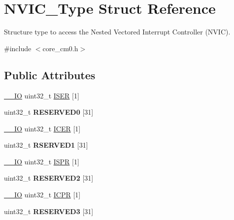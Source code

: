 \hypertarget{struct_n_v_i_c___type}{}\section{N\+V\+I\+C\+\_\+\+Type Struct Reference}
\label{struct_n_v_i_c___type}


Structure type to access the Nested Vectored Interrupt Controller (N\+V\+IC).  




{\ttfamily \#include $<$core\+\_\+cm0.\+h$>$}

\subsection*{Public Attributes}
\begin{DoxyCompactItemize}
\item 
\hyperlink{core__sc300_8h_aec43007d9998a0a0e01faede4133d6be}{\+\_\+\+\_\+\+IO} uint32\+\_\+t \hyperlink{struct_n_v_i_c___type_aaff305f50a7117272e5523ec17cff9ec}{I\+S\+ER} \mbox{[}1\mbox{]}
\item 
uint32\+\_\+t {\bfseries R\+E\+S\+E\+R\+V\+E\+D0} \mbox{[}31\mbox{]}\hypertarget{struct_n_v_i_c___type_adbb4fba725419a6bb67635b05d6f1131}{}\label{struct_n_v_i_c___type_adbb4fba725419a6bb67635b05d6f1131}

\item 
\hyperlink{core__sc300_8h_aec43007d9998a0a0e01faede4133d6be}{\+\_\+\+\_\+\+IO} uint32\+\_\+t \hyperlink{struct_n_v_i_c___type_a856fba9cb1acc608fc03d8f2451bb16a}{I\+C\+ER} \mbox{[}1\mbox{]}
\item 
uint32\+\_\+t {\bfseries R\+S\+E\+R\+V\+E\+D1} \mbox{[}31\mbox{]}\hypertarget{struct_n_v_i_c___type_af524cfb2fdc825d4812449d2e4544a33}{}\label{struct_n_v_i_c___type_af524cfb2fdc825d4812449d2e4544a33}

\item 
\hyperlink{core__sc300_8h_aec43007d9998a0a0e01faede4133d6be}{\+\_\+\+\_\+\+IO} uint32\+\_\+t \hyperlink{struct_n_v_i_c___type_aa98673f8401e00b2dc73003a4d747e0b}{I\+S\+PR} \mbox{[}1\mbox{]}
\item 
uint32\+\_\+t {\bfseries R\+E\+S\+E\+R\+V\+E\+D2} \mbox{[}31\mbox{]}\hypertarget{struct_n_v_i_c___type_ac347bab19adf93f1ed4aa2e719f20c66}{}\label{struct_n_v_i_c___type_ac347bab19adf93f1ed4aa2e719f20c66}

\item 
\hyperlink{core__sc300_8h_aec43007d9998a0a0e01faede4133d6be}{\+\_\+\+\_\+\+IO} uint32\+\_\+t \hyperlink{struct_n_v_i_c___type_a7483899bfdf859f059384dd9aacd0072}{I\+C\+PR} \mbox{[}1\mbox{]}
\item 
uint32\+\_\+t {\bfseries R\+E\+S\+E\+R\+V\+E\+D3} \mbox{[}31\mbox{]}\hypertarget{struct_n_v_i_c___type_a0f3f8095a2d0128337d7c3762a6fbd33}{}\label{struct_n_v_i_c___type_a0f3f8095a2d0128337d7c3762a6fbd33}


\end{DoxyCompactItemize}
